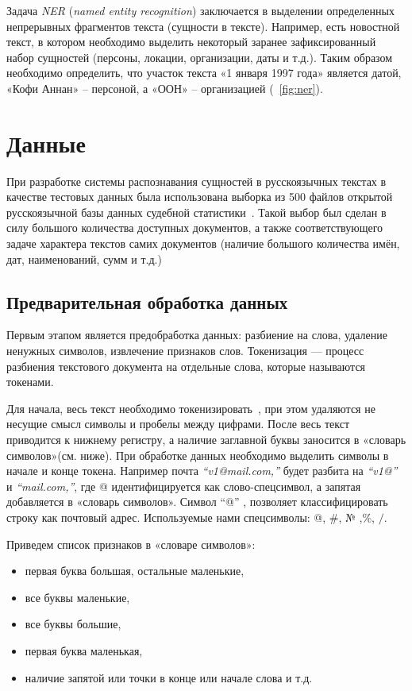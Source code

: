 \documentclass{csmathnotes}
\begin{document}
Задача \emph{NER} (\emph{named entity recognition}) заключается в выделении определенных непрерывных фрагментов текста (сущности в тексте). Например, есть новостной текст, в котором необходимо выделить некоторый заранее зафиксированный набор сущностей (персоны, локации, организации, даты и т.д.). Таким образом необходимо определить, что участок текста «1 января 1997 года» является датой, «Кофи Аннан» – персоной, а «ООН» – организацией (~\ref{fig:ner}). 

\section*{Данные}
При разработке системы распознавания сущностей в русскоязычных текстах в качестве тестовых данных была использована выборка из 500 файлов открытой русскоязычной базы данных судебной статистики~\cite{CourtsData}. Такой выбор был сделан в силу большого количества доступных документов, а также соответствующего задаче характера текстов самих документов (наличие большого количества имён, дат, наименований, сумм и т.д.)

\subsection*{Предварительная обработка данных}
Первым этапом является предобработка данных: разбиение на слова, удаление ненужных символов, извлечение признаков слов. 
Токенизация — процесс разбиения текстового документа на отдельные слова, которые называются токенами.


Для начала, весь текст необходимо токенизировать~\cite{Ner}, при этом удаляются не несущие смысл символы и пробелы между цифрами. После весь текст приводится к нижнему регистру, а наличие заглавной буквы заносится в «словарь символов»(см. ниже).
При обработке данных необходимо выделить символы в начале и конце токена.  Например почта \emph{“v1@mail.com,”} будет разбита на \emph{“v1@”} и \emph{“mail.com,”}, где @ идентифицируется как слово-спецсимвол, а запятая добавляется в «словарь символов». Символ “@” , позволяет классифицировать строку как почтовый адрес. Используемые нами спецсимволы: @, \#, № ,\%, $/$.


Приведем список признаков в «словаре символов»:
\begin{itemize}
	\item первая буква большая, остальные маленькие,
	\item все буквы маленькие,
	\item все буквы большие,
	\item первая буква маленькая,
	\item наличие запятой или точки в конце или начале слова и т.д.
\end{itemize}
\end{document}
